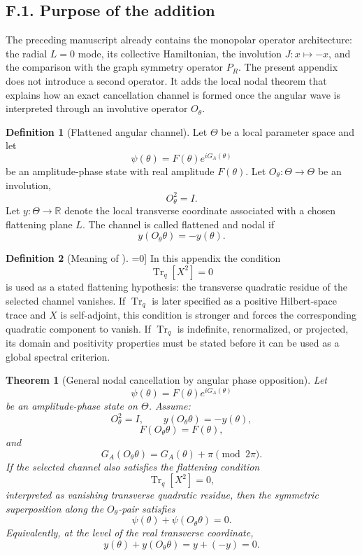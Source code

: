 \documentclass[11pt,letterpaper]{amsart}
\newtheorem{theorem}{Theorem}
\theoremstyle{definition}
\newtheorem{definition}{Definition}
\begin{document}
\subsection*{F.1. Purpose of the addition}

The preceding manuscript already contains the monopolar operator architecture: the radial
\(L=0\) mode, its collective Hamiltonian, the involution \(J:x\mapsto -x\), and the comparison
with the graph symmetry operator \(P_R\). The present appendix does not introduce a second
operator. It adds the local nodal theorem that explains how an exact cancellation channel is
formed once the angular wave is interpreted through an involutive operator \(O_\theta\).

\begin{definition}[Flattened angular channel]
Let \(\Theta\) be a local parameter space and let
\[
  \psi(\theta)=F(\theta)e^{iG_A(\theta)}
\]
be an amplitude-phase state with real amplitude \(F(\theta)\). Let \(O_\theta:\Theta\to\Theta\)
be an involution,
\[
  O_\theta^2=I.
\]
Let \(y:\Theta\to\mathbb{R}\) denote the local transverse coordinate associated with a chosen
flattening plane \(L\). The channel is called flattened and nodal if
\[
  y(O_\theta\theta)=-y(\theta).
\]
\end{definition}

\begin{definition}[Meaning of \(\operatorname{Tr}_q[X^2]=0\)]
In this appendix the condition
\[
  \operatorname{Tr}_q[X^2]=0
\]
is used as a stated flattening hypothesis: the transverse quadratic residue of the selected
channel vanishes. If \(\operatorname{Tr}_q\) is later specified as a positive Hilbert-space trace
and \(X\) is self-adjoint, this condition is stronger and forces the corresponding quadratic
component to vanish. If \(\operatorname{Tr}_q\) is indefinite, renormalized, or projected, its
domain and positivity properties must be stated before it can be used as a global spectral
criterion.
\end{definition}

\begin{theorem}[General nodal cancellation by angular phase opposition]
Let
\[
  \psi(\theta)=F(\theta)e^{iG_A(\theta)}
\]
be an amplitude-phase state on \(\Theta\). Assume:
\[
  O_\theta^2=I,\qquad y(O_\theta\theta)=-y(\theta),
\]
\[
  F(O_\theta\theta)=F(\theta),
\]
and
\[
  G_A(O_\theta\theta)=G_A(\theta)+\pi \pmod{2\pi}.
\]
If the selected channel also satisfies the flattening condition
\[
  \operatorname{Tr}_q[X^2]=0,
\]
interpreted as vanishing transverse quadratic residue, then the symmetric superposition along
the \(O_\theta\)-pair satisfies
\[
  \psi(\theta)+\psi(O_\theta\theta)=0.
\]
Equivalently, at the level of the real transverse coordinate,
\[
  y(\theta)+y(O_\theta\theta)=y+(-y)=0.
\]
\end{theorem}
\end{document}
